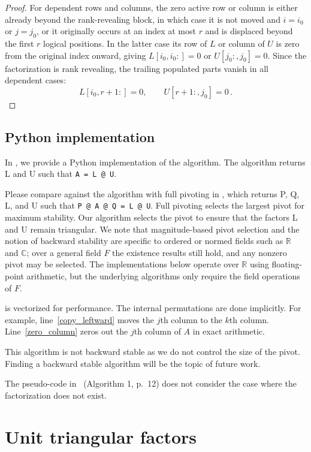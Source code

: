 \documentclass[final]{siamart1116}
\numberwithin{theorem}{section}
\begin{document}
\begin{proof}
  For dependent rows and columns, the zero active row or column is either already beyond the rank-revealing block, in which case it is not moved and $i=i_0$ or $j=j_0$, or it originally occurs at an index at most $r$ and is displaced beyond the first $r$ logical positions. In the latter case its row of $L$ or column of $U$ is zero from the original index onward, giving $L[i_0,i_0:]=0$ or $U[j_0:,j_0]=0$. Since the factorization is rank revealing, the trailing populated parts vanish in all dependent cases:
  \[
    L[i_0,r+1:] = 0, \qquad U[r+1:,j_0] = 0 \,.
  \]
\end{proof}

\subsection{Python implementation}

In , we provide a Python implementation of the algorithm. The algorithm returns L and U such that \verb|A = L @ U|.

Please compare against the algorithm with full pivoting in , which returns P, Q, L, and U such that \verb|P @ A @ Q = L @ U|. Full pivoting selects the largest pivot for maximum stability. Our algorithm selects the pivot to ensure that the factors L and U remain triangular. We note that magnitude-based pivot selection and the notion of backward stability are specific to ordered or normed fields such as $\mathbb{R}$ and $\mathbb{C}$; over a general field $F$ the existence results still hold, and any nonzero pivot may be selected. The implementations below operate over $\mathbb{R}$ using floating-point arithmetic, but the underlying algorithms only require the field operations of $F$.

 is vectorized for performance. The internal permutations are done implicitly. For example, line~\ref{copy_leftward} moves the $j$th column to the $k$th column. Line~\ref{zero_column} zeros out the $j$th column of $A$ in exact arithmetic.

This algorithm is not backward stable as we do not control the size of the pivot. Finding a backward stable algorithm will be the topic of future work.

The pseudo-code in~\cite{okunev_necessary_2005} (Algorithm 1, p.~12) does not consider the case where the factorization does not exist.

\section{Unit triangular factors}\label{sec:unit_triangular}
\end{document}
